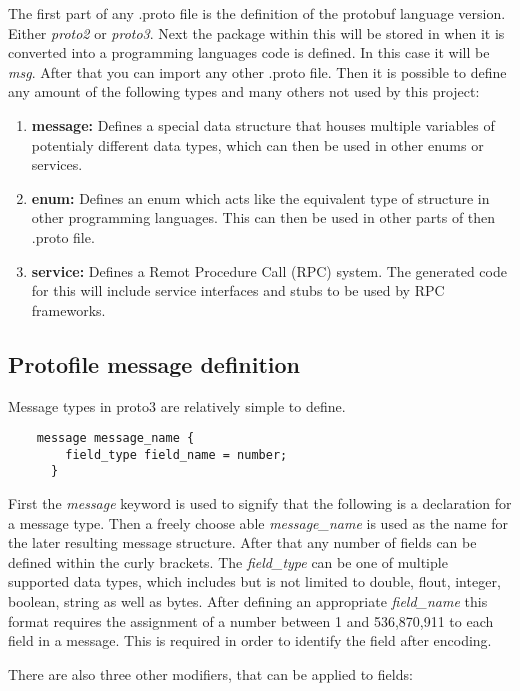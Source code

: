 The first part of any .proto file is the definition of the protobuf language version. Either \textit{proto2} or \textit{proto3}. Next the package within this will be 
stored in when it is converted into a programming languages code is defined. In this case it will be \textit{msg}. After that you can import any other .proto file.
Then it is possible to define any amount of the following types and many others not used by this project:
\begin{enumerate}
    \item \textbf{message:} Defines a special data structure that houses multiple variables of potentialy different data types, which can then be used in other enums or services.
    \item \textbf{enum:} Defines an enum which acts like the equivalent type of structure in other programming languages. This can then be used in other parts of then .proto file.
    \item \textbf{service:} Defines a Remot Procedure Call (RPC) system. The generated code for this will include service interfaces and stubs to be used by RPC frameworks.
\end{enumerate}

\subsection{Protofile message definition}

Message types in proto3 are relatively simple to define.

\begin{verbatim}
    message message_name {
        field_type field_name = number;
      }
\end{verbatim}

First the \textit{message} keyword is used to signify that the following is a declaration for a message type. Then a freely choose able \textit{message\_name} is 
used as the name for the later resulting message structure. After that any number of fields can be defined within the curly brackets. The \textit{field\_type} can be
one of multiple supported data types, which includes but is not limited to double, flout, integer, boolean, string as well as bytes. After defining an appropriate
\textit{field\_name} this format requires the assignment of a number between 1 and 536,870,911 to each field in a message. This is required in order to identify
the field after encoding.

There are also three other modifiers, that can be applied to fields:

